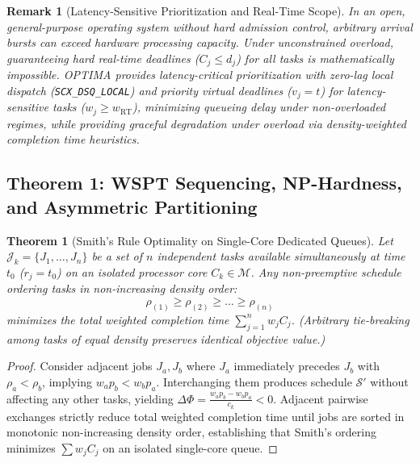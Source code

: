\documentclass[letterpaper,twocolumn,10pt]{article}
\newtheorem{theorem}{Theorem}
\newtheorem{remark}{Remark}
\begin{document}
\begin{remark}[Latency-Sensitive Prioritization and Real-Time Scope]
\label{rem:realtime_softening}
In an open, general-purpose operating system without hard admission control, arbitrary arrival bursts can exceed hardware processing capacity. Under unconstrained overload, guaranteeing hard real-time deadlines ($C_j \le d_j$) for all tasks is mathematically impossible. OPTIMA provides latency-critical prioritization with zero-lag local dispatch (\texttt{SCX\_DSQ\_LOCAL}) and priority virtual deadlines ($v_j = t$) for latency-sensitive tasks ($w_j \ge w_{\mathrm{RT}}$), minimizing queueing delay under non-overloaded regimes, while providing graceful degradation under overload via density-weighted completion time heuristics.
\end{remark}

\subsection{Theorem 1: WSPT Sequencing, NP-Hardness, and Asymmetric Partitioning}

\begin{theorem}[Smith's Rule Optimality on Single-Core Dedicated Queues]
\label{thm:wspt}
Let $\mathcal{J}_k = \{J_1, \dots, J_n\}$ be a set of $n$ independent tasks available simultaneously at time $t_0$ ($r_j = t_0$) on an isolated processor core $C_k \in \mathcal{M}$. Any non-preemptive schedule ordering tasks in non-increasing density order:
\begin{equation}
\rho_{(1)} \ge \rho_{(2)} \ge \dots \ge \rho_{(n)}
\end{equation}
minimizes the total weighted completion time $\sum_{j=1}^n w_j C_j$. (Arbitrary tie-breaking among tasks of equal density preserves identical objective value.)
\end{theorem}

\begin{proof}
Consider adjacent jobs $J_a, J_b$ where $J_a$ immediately precedes $J_b$ with $\rho_a < \rho_b$, implying $w_a p_b < w_b p_a$. Interchanging them produces schedule $\mathcal{S}'$ without affecting any other tasks, yielding $\Delta \Phi = \frac{w_a p_b - w_b p_a}{c_k} < 0$. Adjacent pairwise exchanges strictly reduce total weighted completion time until jobs are sorted in monotonic non-increasing density order, establishing that Smith's ordering minimizes $\sum w_j C_j$ on an isolated single-core queue.
\end{proof}
\end{document}
